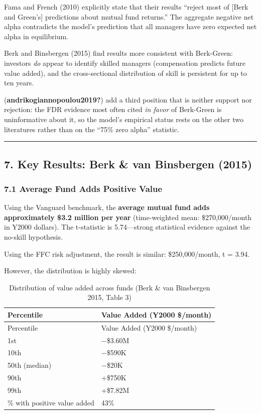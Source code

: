 \documentclass[
  letterpaper,
  DIV=11,
  numbers=noendperiod]{scrartcl}
\begin{document}
Fama and French (2010) explicitly state that their results ``reject most
of {[}Berk and Green's{]} predictions about mutual fund returns.'' The
aggregate negative net alpha contradicts the model's prediction that all
managers have zero expected net alpha in equilibrium.

Berk and Binsbergen (2015) find results more consistent with Berk-Green:
investors \emph{do} appear to identify skilled managers (compensation
predicts future value added), and the cross-sectional distribution of
skill is persistent for up to ten years.

(\textbf{andrikogiannopoulou2019?}) add a third position that is neither
support nor rejection: the FDR evidence most often cited \emph{in favor}
of Berk-Green is uninformative about it, so the model's empirical status
rests on the other two literatures rather than on the ``75\% zero
alpha'' statistic.

\begin{center}\rule{0.5\linewidth}{0.5pt}\end{center}

\subsection{7. Key Results: Berk \& van Binsbergen
(2015)}\label{key-results-berk-van-binsbergen-2015}

\subsubsection{7.1 Average Fund Adds Positive
Value}\label{average-fund-adds-positive-value}

Using the Vanguard benchmark, the \textbf{average mutual fund adds
approximately \$3.2 million per year} (time-weighted mean:
\$270,000/month in Y2000 dollars). The t-statistic is 5.74---strong
statistical evidence against the no-skill hypothesis.

Using the FFC risk adjustment, the result is similar: \$250,000/month, t
= 3.94.

However, the distribution is highly skewed:

\begin{longtable}[]{@{}ll@{}}
\caption{Distribution of value added across funds (Berk \& van
Binsbergen 2015, Table 3)}\tabularnewline
\toprule\noalign{}
Percentile & Value Added (Y2000 \$/month) \\
\midrule\noalign{}
\endfirsthead
\toprule\noalign{}
Percentile & Value Added (Y2000 \$/month) \\
\midrule\noalign{}
\endhead
\bottomrule\noalign{}
\endlastfoot
1st & −\$3.60M \\
10th & −\$590K \\
50th (median) & −\$20K \\
90th & +\$750K \\
99th & +\$7.82M \\
\% with positive value added & 43\% \\
\end{longtable}
\end{document}
